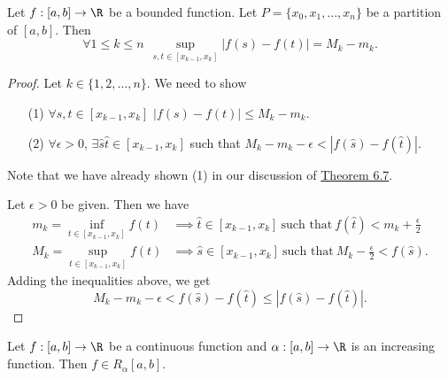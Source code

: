 \begin{lemma}\label{lemma 1}
    Let \( f:[a,b] \to \R  \) be a bounded function. Let \( P = \{  {x}_{0}, {x}_{1}, \dots, {x}_{n} \}  \) be a partition of \( [a,b] \). Then 
    \[  \forall 1 \leq k \leq n \ \ \sup_{s,t \in [{x}_{k-1}, {x}_{k}]} | f(s) -f(t) | = {M}_{k } -{m}_{k }. \]
\end{lemma}
\begin{proof}
Let \( k \in \{  1, 2 , \dots, n \}  \). We need to show
\begin{enumerate}
    \item[(1)] \( \forall s,t \in [{x}_{k-1}, {x}_{k}] \) \( | f(s) - f(t) |  \leq {M}_{k } - {m}_{k} \).
    \item[(2)] \( \forall \epsilon >0  \), \( \exists \hat{s} \hat{t} \in [{x}_{k-1}, {x}_{k}]  \) such that \( {M}_{k } - {m}_{k } - \epsilon < | f(\hat{s}) - f(\hat{t}) |  \). 
\end{enumerate}
Note that we have already shown (1) in our discussion of {\hyperref[Rudin 6.7]{Theorem 6.7}}. 

Let \( \epsilon > 0  \) be given. Then we have
\begin{align*}
    {m}_{k } = \inf_{t \in [{x}_{k-1}, {x}_{k}]} f(t) &\implies \hat{t} \in [{x}_{k-1}, {x}_{k}] \ \text{such that} \ f(\hat{t}) < {m}_{k } + \frac{ \epsilon }{ 2 }  \\
    {M}_{k }  = \sup_{t \in [{x}_{k-1}, {x}_{k}]} f(t) &\implies \hat{s} \in [{x}_{k-1}, {x}_{k}] \ \text{such that} \ {M}_{k }  - \frac{ \epsilon }{ 2 }  < f(\hat{s}).
\end{align*}
Adding the inequalities above, we get
\[  {M}_{k } - {m}_{k } - \epsilon < f(\hat{s}) - f(\hat{t}) \leq | f(\hat{s}) - f(\hat{t}) |. \]
\end{proof}

\begin{theorem}[Rudin 6.8]\label{Rudin 6.8}
    Let \( f:[a,b] \to \R  \) be a continuous function and \( \alpha: [a,b] \to \R  \) is an increasing function. Then \( f \in {R}_{\alpha}[a,b] \). 
\end{theorem}

